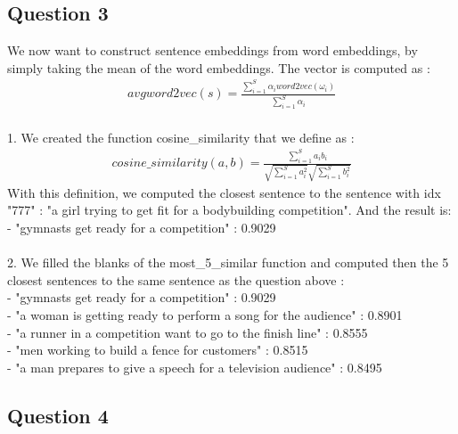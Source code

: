 \documentclass[11pt, oneside]{article}   	%
\begin{document}
\subsection{Question 3}

We now want to construct sentence embeddings from word embeddings, by simply taking the mean of the word embeddings. The vector is computed as :\\
	\[\begin{split}
		avgword2vec(s) = \frac{\sum_{i=1}^{S}\alpha_{i}word2vec(\omega_{i})}{\sum_{i=1}^{S}\alpha_{i}}
	\end{split}\]
\\
1. We created the function cosine\_similarity that we define as :\\
	\[\begin{split}
		cosine\_similarity(a,b) = \frac{\sum_{i=1}^{S}a_{i}b_{i}}{\sqrt{\sum_{i=1}^{S}a_{i}^{2}}\sqrt{\sum_{i=1}^{S}b_{i}^{2}}}
	\end{split}\]
With this definition, we computed the closest sentence to the sentence with idx "777" : "a girl trying to get fit for a bodybuilding competition". And the result is:\\
\indent - "gymnasts get ready for a competition" : 0.9029\\
\\
2. We filled the blanks of the most\_5\_similar function and computed then the 5 closest sentences to the same sentence as the question above :\\
\indent - "gymnasts get ready for a competition" : 0.9029\\
\indent - "a woman is getting ready to perform a song for the audience" : 0.8901\\
\indent - "a runner in a competition want to go to the finish line" : 0.8555\\
\indent - "men working to build a fence for customers" : 0.8515\\
\indent - "a man prepares to give a speech for a television audience" : 0.8495

\subsection{Question 4}
\end{document}
